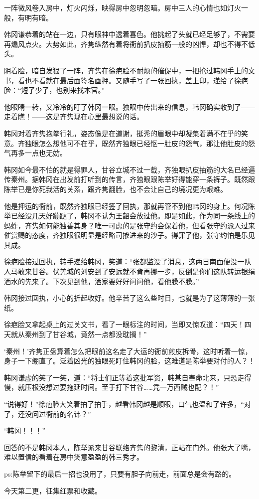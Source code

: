 一阵微风卷入房中，灯火闪烁，映得房中忽明忽暗。房中三人的心情也如灯火一般，有明有暗。

韩冈谦恭着的站在一边，只有眼神中透着喜色。他挑起了头就已经足够了，不需要再煽风点火。大势如此，齐隽纵然有着将衙前扒皮抽筋一般的凶悍，却也不得不低头。

阴着脸，暗自发狠了一阵，齐隽在徐疤脸不耐烦的催促中，一把抢过韩冈手上的文书，看也不看就在最后面签名画押。又随手写了一张回执，盖上印，递给了徐疤脸：“短了少了，也别来找本官。”

他眼睛一转，又冷冷的盯了韩冈一眼。独眼中传出来的信息，韩冈确实收到了——走着瞧！——这是齐隽现在心里最想说的话。

韩冈对着齐隽抱拳行礼，姿态像是在道谢，挺秀的眉眼中却凝集着满不在乎的笑意。齐独眼怎么想他可不在乎，既然齐独眼已经怄一肚皮的怨气，那让他肚皮的怨气再多一点也无妨。

韩冈如今最不怕的就是得罪人，甘谷立城不过一载，齐独眼扒皮抽筋的大名已经遍传秦州。据韩冈在出发前打听到的传言，齐独眼跟陈举好得能穿一条裤子。既然跟陈举已是你死我活的关系，跟齐隽翻脸，也不会让自己的境况更为艰难。

他是押运的衙前，既然齐独眼已经签了回执，那就再管不到他韩冈的身上。何况陈举已经没几天好蹦跶了，韩冈不认为王韶会放过他。即是如此，作为同一条线上的蚂蚱，齐隽如何能独善其身？唯一可虑的是张守约会保着他，但看张守约派人过来催赏赐的态度，齐独眼很明显是经略司掺进来的沙子。得罪了他，张守约怕是乐见其成。

徐疤脸接过回执，转手递给韩冈，笑道：“张都监没了消息，这两日南面便没一队人马敢来甘谷。伏羌城的刘安到了安远就不肯再挪一步，反倒是你们这队转运银绢酒水的先来了。下次见到他，洒家要好好问问他，看他臊不臊。”

韩冈接过回执，小心的折起收好。他辛苦了这么些时日，也就是为了这薄薄的一张纸。

徐疤脸又拿起桌上的过关文书，看了一眼标注的时间，当即又惊叹道：“四天！四天就从秦州到了甘谷城，竟然一点都没耽搁！”

‘秦州！’齐隽正盘算着怎么把眼前这名走了大运的衙前煎皮拆骨，这时听着一惊，身子一下绷直了。泛着凶光的独眼死盯住韩冈的脸，这难道是陈举要对付的人？！

韩冈谦虚的笑了一笑，道：“将士们正等着这批军资，韩某自奉命北来，只恐走得慢，就压根没想过要拖延时间。至于打下甘谷……凭一万西贼也配？！”

“说得好！”徐疤脸大笑着拍了拍手，越看韩冈越是顺眼，口气也温和了许多，“对了，还没问过衙前的名讳？”

“韩冈！！！”

回答的不是韩冈本人，陈举派来甘谷联络齐隽的黎清，正站在门外。他张大了嘴，难以置信的看着在房中笑意盈盈的韩三秀才。

ps:陈举留下的最后一招也没用了，只要有胆子向前走，前面总是会有路的。

今天第二更，征集红票和收藏。

